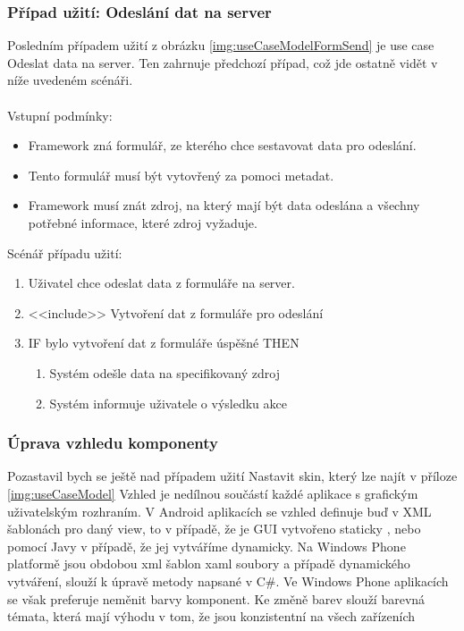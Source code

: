 \subsubsection{Případ užití: Odeslání dat na server}
Posledním případem užití z obrázku \ref{img:useCaseModelFormSend} je use case Odeslat data na server. Ten zahrnuje předchozí případ, což jde ostatně vidět v níže uvedeném scénáři.\\\\
Vstupní podmínky:
\begin{itemize}
\item Framework zná formulář, ze kterého chce sestavovat data pro odeslání.
\item Tento formulář musí být vytovřený za pomoci metadat.
\item Framework musí znát zdroj, na který mají být data odeslána a všechny potřebné informace, které zdroj vyžaduje. 
\end{itemize}
Scénář případu užití:
\begin{enumerate}
\item Uživatel chce odeslat data z formuláře na server.
\item <<include>> Vytvoření dat z formuláře pro odeslání
\item IF bylo vytvoření dat z formuláře úspěšné THEN
\begin{enumerate}
\item Systém odešle data na specifikovaný zdroj
\item Systém informuje uživatele o výsledku akce
\end{enumerate}
\end{enumerate}

\subsubsection{Úprava vzhledu komponenty}
Pozastavil bych se ještě nad případem užití Nastavit skin, který lze najít v příloze \ref{img:useCaseModel} Vzhled je nedílnou součástí každé aplikace s grafickým uživatelským rozhraním. V Android aplikacích se vzhled definuje buď v XML šablonách pro daný view, to v případě, že je GUI vytvořeno staticky \cite{android-themes}, nebo pomocí Javy v případě, že jej vytváříme dynamicky. Na Windows Phone platformě jsou obdobou xml šablon xaml soubory a případě dynamického vytváření, slouží k úpravě metody napsané v C\#. Ve Windows Phone aplikacích se však preferuje neměnit barvy komponent. Ke změně barev slouží barevná témata, která mají výhodu v tom, že jsou konzistentní na všech zařízeních \cite{wp-themes}

